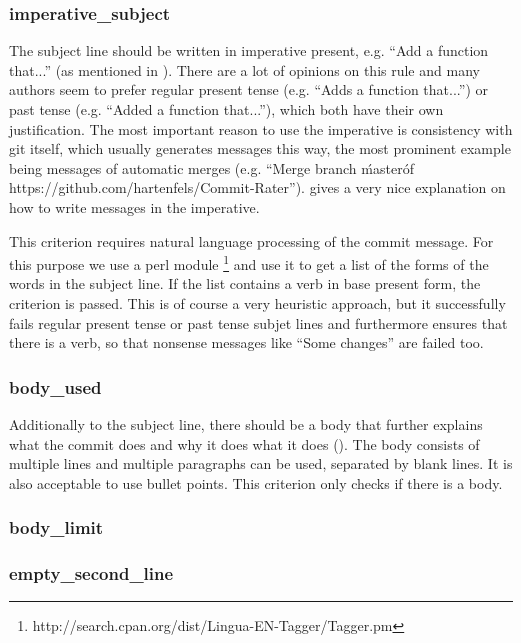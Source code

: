 \subsubsection{imperative_subject}
\label{subs:imperative_subject}
The subject line should be written in imperative present, e.g. ``Add a function that...'' (as mentioned in \cite{OffGuide}). There are a lot of opinions on this rule and many authors seem to prefer regular present tense (e.g. ``Adds a function that...'') or past tense (e.g. ``Added a function that...''), which both have their own justification. The most important reason to use the imperative is consistency with git itself, which usually generates messages this way, the most prominent example being messages of automatic merges (e.g. ``Merge branch \'master\' of https://github.com/hartenfels/Commit-Rater''). \cite{CB} gives a very nice explanation on how to write messages in the imperative.

This criterion requires natural language processing of the commit
message. For this purpose we use a perl module \footnote{http://search.cpan.org/dist/Lingua-EN-Tagger/Tagger.pm} and use it to get a list of the forms of the words in the subject line. If the list contains a verb in base present form, the criterion is passed. This is of course a very heuristic approach, but it successfully fails regular present tense or past tense subjet lines and furthermore ensures that there is a verb, so that nonsense messages like ``Some changes'' are failed too.

\subsubsection{body_used}
\label{subs:body_used}
Additionally to the subject line, there should be a body that further explains what the commit does and why it does what it does (\cite{OffGuide}). The body consists of multiple lines and multiple paragraphs can be used, separated by blank lines. It is also acceptable to use bullet points. This criterion only checks if there is a body.

\subsubsection{body_limit}
\label{subs:body_limit}

\subsubsection{empty_second_line}
\label{subs:empty_second_line}

